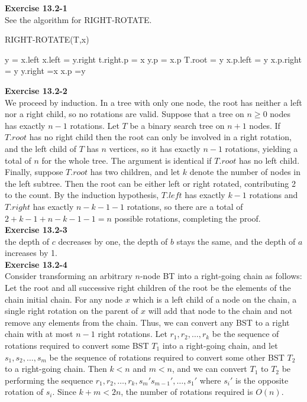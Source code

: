 \documentclass{article}
\begin{document}
\noindent\textbf{ Exercise 13.2-1} \\

See the algorithm for RIGHT-ROTATE.\\


\begin{algorithm}
\caption{RIGHT-ROTATE(T,x)}
\begin{algorithmic}
\State y = x.left
\State x.left = y.right
\State t.right.p = x
\EndIf
\State y.p = x.p
\State T.root = y
\State x.p.left = y
\Else
\State x.p.right = y
\EndIf
\State y.right =x
\State x.p =y
\end{algorithmic}
\end{algorithm}

\noindent\textbf{Exercise 13.2-2}\\

We proceed by induction.  In a tree with only one node, the root has neither a left nor a right child, so no rotations are valid.  Suppose that a tree on $n\geq 0$ nodes has exactly $n-1$ rotations.  Let $T$ be a binary search tree on $n+1$ nodes.  If $T.root$ has no right child then the root can only be involved in a right rotation, and the left child of $T$ has $n$ vertices, so it has exactly $n-1$ rotations, yielding a total of $n$ for the whole tree.  The argument is identical if $T.root$ has no left child.  Finally, suppose $T.root$ has two children, and let $k$ denote the number of nodes in the left subtree.  Then the root can be either left or right rotated, contributing 2 to the count.  By the induction hypothesis, $T.left$ has exactly $k-1$ rotations and $T.right$ has exactly $n-k-1-1$ rotations, so there are a total of $2 + k-1 + n-k-1-1 = n$ possible rotations, completing the proof. \\

\noindent\textbf{ Exercise 13.2-3} \\

the depth of $c$ decreases by one, the depth of $b$ stays the same, and the depth of $a$ increases by 1.\\

\noindent\textbf{Exercise 13.2-4}\\

Consider transforming an arbitrary $n$-node BT into a right-going chain as follows: Let the root and all successive right children of the root be the elements of the chain initial chain.  For any node $x$ which is a left child of a node on the chain, a single right rotation on the parent of $x$ will add that node to the chain and not remove any elements from the chain.  Thus, we can convert any BST to a right chain with at most $n-1$ right rotations.  Let $r_1, r_2, \ldots, r_k$ be the sequence of rotations required to convert some BST $T_1$ into a right-going chain, and let $s_1, s_2, \ldots, s_m$ be the sequence of rotations required to convert some other BST $T_2$ to a right-going chain.  Then $k < n$ and $m < n$, and we can convert $T_1$ to $T_2$ be performing the sequence $r_1, r_2, \ldots, r_k, s_m' s_{m-1}', \ldots, s_1'$ where $s_i'$ is the opposite rotation of $s_i$.  Since $k+m < 2n$, the number of rotations required is $O(n)$. \\
\end{document}

